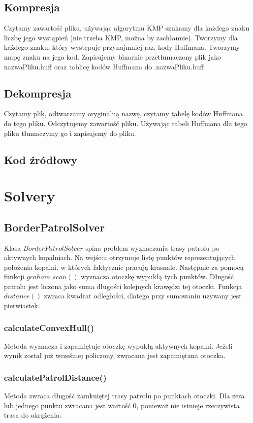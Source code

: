 \documentclass{article}
\begin{document}
\subsection{Kompresja}
Czytamy zawartość pliku, używając algorytmu KMP szukamy dla każdego znaku liczbę jego wystąpień (nie trzeba KMP, można by zachłannie). Tworzymy dla każdego znaku, który występuje przynajmniej raz, kody Huffmana. Tworzymy mapę znaku na jego kod. Zapisujemy binarnie przetłumaczony plik jako nazwaPliku.huff oraz tablicę kodów Huffmana do .nazwaPliku.huff
\subsection{Dekompresja}
Czytamy plik, odtwarzamy oryginalną nazwę, czytamy tabelę kodów Huffmana do tego pliku. Odczytujemy zawartość pliku. Używając tabeli Huffmana dla tego pliku tłumaczymy go i zapisujemy do pliku. 
\subsection{Kod źródłowy}


\section{Solvery}
\subsection{BorderPatrolSolver}
Klasa $BorderPatrolSolver$ spina problem wyznaczania trasy patrolu po aktywnych kopalniach. Na wejściu otrzymuje listę punktów reprezentujących położenia kopalni, w których faktycznie pracują krasnale. Następnie za pomocą funkcji $graham\_scan()$ wyznacza otoczkę wypukłą tych punktów. Długość patrolu jest liczona jako suma długości kolejnych krawędzi tej otoczki. Funkcja $distance()$ zwraca kwadrat odległości, dlatego przy sumowaniu używany jest pierwiastek.

\subsubsection{calculateConvexHull()}
Metoda wyznacza i zapamiętuje otoczkę wypukłą aktywnych kopalni. Jeżeli wynik został już wcześniej policzony, zwracana jest zapamiętana otoczka.

\subsubsection{calculatePatrolDistance()}
Metoda zwraca długość zamkniętej trasy patrolu po punktach otoczki. Dla zera lub jednego punktu zwracana jest wartość $0$, ponieważ nie istnieje rzeczywista trasa do okrążenia.
\end{document}
